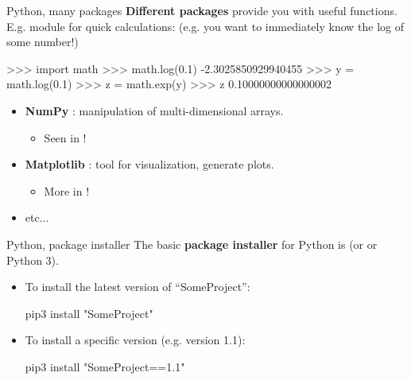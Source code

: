 \begin{frame}[fragile]{Python, many packages}
\vspace{-3mm}
\textbf{Different packages} provide you with useful functions.\\
\vsp
E.g.  module for quick calculations:
(e.g. you want to immediately know the log of some number!)
\begin{python}
>>> import math
>>> math.log(0.1)
-2.3025850929940455
>>> y = math.log(0.1)
>>> z = math.exp(y)
>>> z
0.10000000000000002
\end{python}
\begin{itemize}
\item \textbf{NumPy} : manipulation of multi-dimensional arrays.\\
\begin{itemize}
\item Seen in  !
\end{itemize}
\item \textbf{Matplotlib} : tool for visualization, generate plots.
\begin{itemize}
\item More in  !
\end{itemize}
\item etc...
\end{itemize}
\end{frame}

\begin{frame}[fragile]{Python, package installer}
\vspace{-3mm}
The basic \textbf{package installer} for Python is  (or  or Python 3).\\
\vsp
\begin{itemize}
\item To install the latest version of ``SomeProject”:\\
\begin{python}
pip3 install "SomeProject"
\end{python}
\item To install a specific version (e.g. version 1.1):\\
\begin{python}
pip3 install "SomeProject==1.1"
\end{python}
\end{itemize}
\end{frame}

